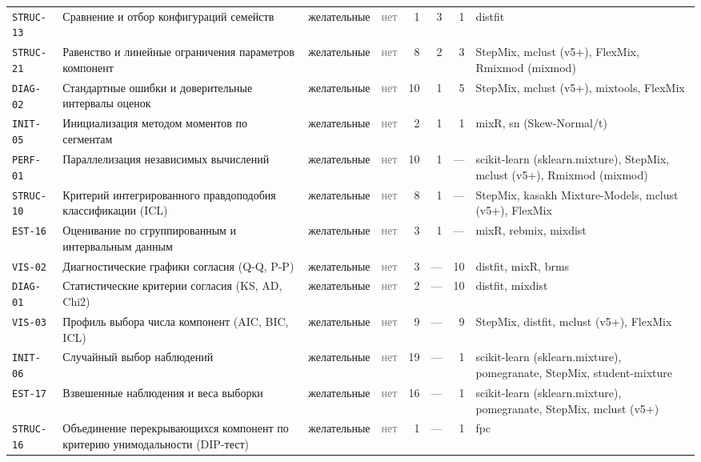 \documentclass[10pt,a4paper]{article}
\begin{document}
\begin{landscape}
{\begin{longtable}{@{}l >{\raggedright\arraybackslash}p{8.2cm} l l r r r >{\raggedright\arraybackslash}p{6.2cm}@{}}
\texttt{STRUC-13} & Сравнение и отбор конфигураций семейств & желательные & \textcolor{gray}{нет} & 1 & 3 & 1 & distfit \\
\texttt{STRUC-21} & Равенство и линейные ограничения параметров компонент & желательные & \textcolor{gray}{нет} & 8 & 2 & 3 & StepMix, mclust (v5+), FlexMix, Rmixmod (mixmod) \\
\texttt{DIAG-02} & Стандартные ошибки и доверительные интервалы оценок & желательные & \textcolor{gray}{нет} & 10 & 1 & 5 & StepMix, mclust (v5+), mixtools, FlexMix \\
\texttt{INIT-05} & Инициализация методом моментов по сегментам & желательные & \textcolor{gray}{нет} & 2 & 1 & 1 & mixR, sn (Skew-Normal/t) \\
\texttt{PERF-01} & Параллелизация независимых вычислений & желательные & \textcolor{gray}{нет} & 10 & 1 & --- & scikit-learn (sklearn.mixture), StepMix, mclust (v5+), Rmixmod (mixmod) \\
\texttt{STRUC-10} & Критерий интегрированного правдоподобия классификации (ICL) & желательные & \textcolor{gray}{нет} & 8 & 1 & --- & StepMix, kasakh Mixture-Models, mclust (v5+), FlexMix \\
\texttt{EST-16} & Оценивание по сгруппированным и интервальным данным & желательные & \textcolor{gray}{нет} & 3 & 1 & --- & mixR, rebmix, mixdist \\
\texttt{VIS-02} & Диагностические графики согласия (Q-Q, P-P) & желательные & \textcolor{gray}{нет} & 3 & --- & 10 & distfit, mixR, brms \\
\texttt{DIAG-01} & Статистические критерии согласия (KS, AD, Chi2) & желательные & \textcolor{gray}{нет} & 2 & --- & 10 & distfit, mixdist \\
\texttt{VIS-03} & Профиль выбора числа компонент (AIC, BIC, ICL) & желательные & \textcolor{gray}{нет} & 9 & --- & 9 & StepMix, distfit, mclust (v5+), FlexMix \\
\texttt{INIT-06} & Случайный выбор наблюдений & желательные & \textcolor{gray}{нет} & 19 & --- & 1 & scikit-learn (sklearn.mixture), pomegranate, StepMix, student-mixture \\
\texttt{EST-17} & Взвешенные наблюдения и веса выборки & желательные & \textcolor{gray}{нет} & 16 & --- & 1 & scikit-learn (sklearn.mixture), pomegranate, StepMix, mclust (v5+) \\
\texttt{STRUC-16} & Объединение перекрывающихся компонент по критерию унимодальности (DIP-тест) & желательные & \textcolor{gray}{нет} & 1 & --- & 1 & fpc \\

\end{longtable}}
\end{landscape}
\end{document}
